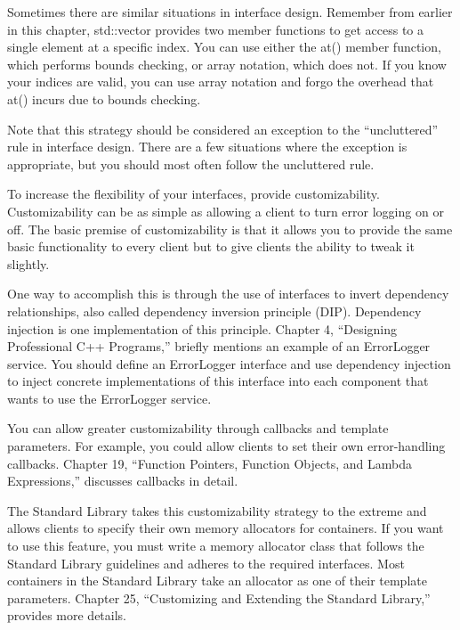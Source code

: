Sometimes there are similar situations in interface design. Remember from earlier in this chapter, std::vector provides two member functions to get access to a single element at a specific index. You can use either the at() member function, which performs bounds checking, or array notation, which does not. If you know your indices are valid, you can use array notation and forgo the overhead that at() incurs due to bounds checking.

Note that this strategy should be considered an exception to the “uncluttered” rule in interface design. There are a few situations where the exception is appropriate, but you should most often follow the uncluttered rule.


To increase the flexibility of your interfaces, provide customizability. Customizability can be as simple as allowing a client to turn error logging on or off. The basic premise of customizability is that it allows you to provide the same basic functionality to every client but to give clients the ability to tweak it slightly.

One way to accomplish this is through the use of interfaces to invert dependency relationships, also called dependency inversion principle (DIP). Dependency injection is one implementation of this principle. Chapter 4, “Designing Professional C++ Programs,” briefly mentions an example of an ErrorLogger service. You should define an ErrorLogger interface and use dependency injection to inject concrete implementations of this interface into each component that wants to use the ErrorLogger service.

You can allow greater customizability through callbacks and template parameters. For example, you could allow clients to set their own error-handling callbacks. Chapter 19, “Function Pointers, Function Objects, and Lambda Expressions,” discusses callbacks in detail.

The Standard Library takes this customizability strategy to the extreme and allows clients to specify their own memory allocators for containers. If you want to use this feature, you must write a memory allocator class that follows the Standard Library guidelines and adheres to the required interfaces. Most containers in the Standard Library take an allocator as one of their template parameters. Chapter 25, “Customizing and Extending the Standard Library,” provides more details.



